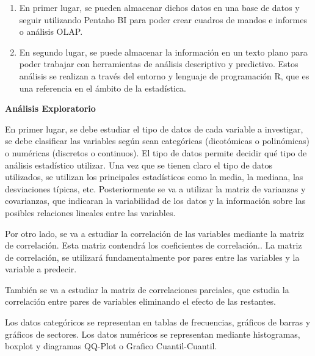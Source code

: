 \begin{enumerate}
	\item  En primer lugar, se pueden almacenar dichos datos en una base de datos y seguir utilizando Pentaho BI para poder crear cuadros de mandos e informes o análisis OLAP. 
	
	\item  En segundo lugar, se puede almacenar la información en un texto plano para poder trabajar con herramientas de análisis descriptivo y predictivo. Estos análisis se realizan a través del entorno y lenguaje de programación R, que es una referencia en el ámbito de la estadística.
\end{enumerate}

\textbf{Análisis Exploratorio}


En primer lugar, se debe estudiar el tipo de datos de cada variable a investigar, se debe clasificar las variables según sean categóricas (dicotómicas o polinómicas) o numéricas (discretos o continuos). El tipo de datos permite decidir qué tipo de análisis estadístico utilizar.
Una vez que se tienen claro el tipo de datos utilizados, se utilizan los principales estadísticos como la media, la mediana, las desviaciones típicas, etc.
Posteriormente se va a utilizar la matriz de varianzas y covarianzas, que indicaran la variabilidad de los datos y la información sobre las posibles relaciones lineales entre las variables. 

Por otro lado, se va a estudiar la correlación de las variables mediante la matriz de correlación. Esta matriz contendrá los coeficientes de correlación.\cite{JMMarin}. La matriz de correlación, se utilizará fundamentalmente por pares entre las variables y la variable a predecir.

También se va a estudiar la matriz de correlaciones parciales, que estudia la correlación entre pares de variables eliminando el efecto de las restantes.\cite{JMMarin}

Los datos categóricos se representan en tablas de frecuencias, gráficos de barras y gráficos de sectores. Los datos numéricos se representan mediante histogramas, boxplot y diagramas QQ-Plot o Grafico Cuantil-Cuantil. \cite{Orellana2001}

